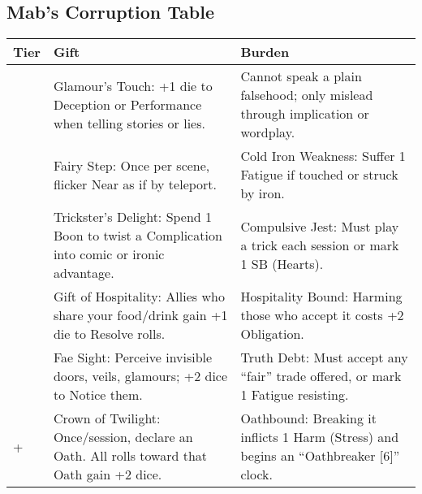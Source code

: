 
\subsection*{Mab’s Corruption Table}
\label{sec:mab-corruption}

\begin{longtable}{>{\raggedright\arraybackslash}p{1cm} p{5cm} p{5cm}}
\toprule
\textbf{Tier} & \textbf{Gift} & \textbf{Burden} \\
\midrule
1 & Glamour’s Touch: +1 die to Deception or Performance when telling stories or lies. & Cannot speak a plain falsehood; only mislead through implication or wordplay. \\
\midrule
2 & Fairy Step: Once per scene, flicker Near as if by teleport. & Cold Iron Weakness: Suffer 1 Fatigue if touched or struck by iron. \\
\midrule
3 & Trickster’s Delight: Spend 1 Boon to twist a Complication into comic or ironic advantage. & Compulsive Jest: Must play a trick each session or mark 1 SB (Hearts). \\
\midrule
4 & Gift of Hospitality: Allies who share your food/drink gain +1 die to Resolve rolls. & Hospitality Bound: Harming those who accept it costs +2 Obligation. \\
\midrule
5 & Fae Sight: Perceive invisible doors, veils, glamours; +2 dice to Notice them. & Truth Debt: Must accept any “fair” trade offered, or mark 1 Fatigue resisting. \\
\midrule
6+ & Crown of Twilight: Once/session, declare an Oath. All rolls toward that Oath gain +2 dice. & Oathbound: Breaking it inflicts 1 Harm (Stress) and begins an “Oathbreaker [6]” clock. \\
\bottomrule
\end{longtable}